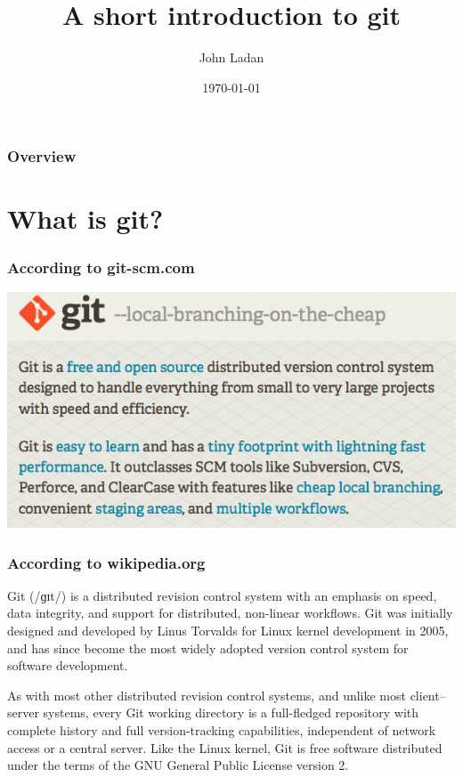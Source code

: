 \documentclass{beamer}
\title[git]{A short introduction to git}
\author{John Ladan}
\institute[Waterloo]{University of Waterloo\\john@ladan.ca}
\date{\today}
\begin{document}
\begin{frame}
    \titlepage
\end{frame}

\begin{frame}
    \frametitle{Overview}
    \tableofcontents
\end{frame}


\section{What is git?}

\begin{frame}
    \frametitle{According to git-scm.com}
    \includegraphics[width=.8\textwidth]{figures/git-homepage}
\end{frame}

\begin{frame}
    \frametitle{According to wikipedia.org}
    Git (/ɡɪt/) is a distributed revision control system with an emphasis on speed, data integrity, and support for distributed, non-linear workflows. Git was initially designed and developed by Linus Torvalds for Linux kernel development in 2005, and has since become the most widely adopted version control system for software development.

    As with most other distributed revision control systems, and unlike most client–server systems, every Git working directory is a full-fledged repository with complete history and full version-tracking capabilities, independent of network access or a central server. Like the Linux kernel, Git is free software distributed under the terms of the GNU General Public License version 2.
\end{frame}
\end{document}
